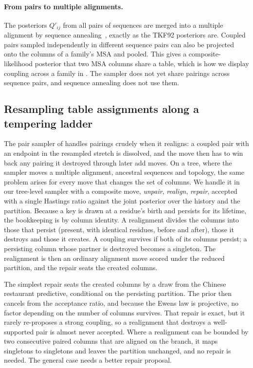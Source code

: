 \documentclass[11pt]{article}
\begin{document}
\paragraph{From pairs to multiple alignments.} The posteriors $Q'_{ij}$ from
all pairs of sequences are merged into a multiple alignment by sequence
annealing~\citep{BradleyEtAl2009}, exactly as the TKF92 posteriors are.
Coupled pairs sampled independently in different sequence pairs can also be
projected onto the columns of a family's MSA and pooled. This gives a
composite-likelihood posterior that two MSA columns share a table, which is
how we display coupling across a family in . The sampler
does not yet share pairings across sequence pairs, and sequence annealing does
not use them.

\subsection{Resampling table assignments along a tempering ladder}
\label{sec:ladder}

The pair sampler of  handles pairings crudely when it
realigns: a coupled pair with an endpoint in the resampled stretch is
dissolved, and the move then has to win back any pairing it destroyed through
later add moves. On a tree, where the sampler moves a multiple alignment,
ancestral sequences and topology, the same problem arises for every move
that changes the set of columns. We handle it in our tree-level sampler with a
composite move, \emph{unpair}, \emph{realign}, \emph{repair}, accepted with a
single Hastings ratio against the joint posterior over the history and the
partition. Because a key is drawn at a residue's birth and persists for its
lifetime, the bookkeeping is by column identity. A realignment divides the
columns into those that persist (present, with identical residues, before
and after), those it destroys and those it creates. A coupling survives if
both of its columns persist; a persisting column whose partner is destroyed
becomes a singleton. The realignment is then an ordinary alignment move
scored under the reduced partition, and the repair seats the created columns.

The simplest repair seats the created columns by a draw from the Chinese
restaurant predictive, conditional on the persisting partition. The prior
then cancels from the acceptance ratio, and because the Ewens law is
projective, no factor depending on the number of columns survives. That
repair is exact, but it rarely re-proposes a strong coupling, so a
realignment that destroys a well-supported pair is almost never accepted.
Where a realignment can be bounded by two consecutive paired columns that are
aligned on the branch, it maps singletons to singletons and leaves the
partition unchanged, and no repair is needed. The general case needs a
better repair proposal.
\end{document}
